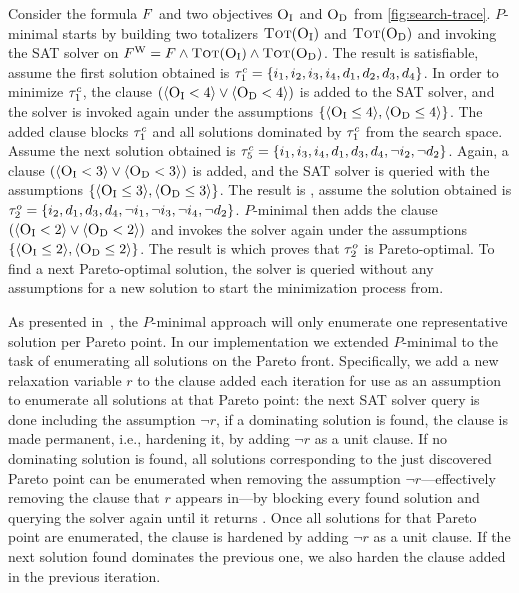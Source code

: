 \begin{example}\label{ex:pmin}
  Consider the formula $F$ and two objectives $\textsc{O}_{\text{I}}$ and $\textsc{O}_{\text{D}}$ from \cref{fig:search-trace}.
  $P$-minimal starts by building two totalizers $\textsc{Tot}(\textsc{O}_{\text{I}})$ and $\textsc{Tot}(\textsc{O}_{\text{D}})$ and invoking the SAT solver on $F^\text{W} = F \land \textsc{Tot}(\textsc{O}_{\text{I}}) \land \textsc{Tot}(\textsc{O}_{\text{D}})$.
  The result is satisfiable, assume the first solution obtained is $\tau^c_1 = \{i_1,\allowbreak i_2,\allowbreak i_3,\allowbreak i_4,\allowbreak d_1,\allowbreak d_2,\allowbreak d_3,\allowbreak d_4\}$. 
  In order to minimize $\tau^c_1$, the clause $(\langle \textsc{O}_{\text{I}} < 4 \rangle \lor \langle \textsc{O}_{\text{D}} < 4 \rangle)$ is added to the SAT solver, and the solver is invoked again under the assumptions $\{ \langle \textsc{O}_{\text{I}} \leq 4 \rangle, \langle \textsc{O}_{\text{D}} \leq 4 \rangle \}$.
  The added clause blocks $\tau^c_1$ and all solutions dominated by $\tau^c_1$ from the search space.
  Assume the next solution obtained is $\tau^c_5 = \{i_1,\allowbreak i_3,\allowbreak i_4,\allowbreak d_1,\allowbreak d_3,\allowbreak d_4,\allowbreak \lnot i_2,\allowbreak \lnot d_2\}$. 
  Again, a clause $(\langle \textsc{O}_{\text{I}} < 3 \rangle \lor \langle \textsc{O}_{\text{D}} < 3 \rangle)$ is added, and the SAT solver is queried with the assumptions $\{ \langle \textsc{O}_{\text{I}} \leq 3 \rangle, \langle \textsc{O}_{\text{D}} \leq 3 \rangle \}$.
  The result is \sat{}, assume the solution obtained is $\tau^o_2 = \{i_2,\allowbreak d_1,\allowbreak d_3,\allowbreak d_4,\allowbreak \lnot i_1,\allowbreak \lnot i_3,\allowbreak \lnot i_4,\allowbreak \lnot d_2\}$. 
  $P$-minimal then adds the clause $(\langle \textsc{O}_{\text{I}} < 2 \rangle \lor \langle \textsc{O}_{\text{D}} < 2 \rangle)$ and invokes the solver again under the assumptions $\{ \langle \textsc{O}_{\text{I}} \leq 2 \rangle, \langle \textsc{O}_{\text{D}} \leq 2 \rangle \}$.
  The result is \unsat{} which proves that $\tau^o_2$ is Pareto-optimal. 
  To find a next Pareto-optimal solution, the solver is queried without any assumptions for a new solution to start the minimization process from.
\end{example}

As presented in~\cite{DBLP:conf/cp/SohBTB17}, the $P$-minimal approach will only enumerate one representative solution per Pareto point.
In our implementation we extended $P$-minimal to the task of enumerating all solutions on the Pareto front.
Specifically, we add a new relaxation variable $r$ to the clause added each iteration for use as an assumption to enumerate all solutions at that Pareto point:
the next SAT solver query is done including the assumption $\lnot r$, if a dominating solution is found, the clause is made permanent, i.e., hardening it, by adding $\lnot r$ as a unit clause.
If no dominating solution is found, all solutions corresponding to the just discovered Pareto point can be enumerated when removing the assumption $\lnot r$---effectively removing the clause that $r$ appears in---by blocking every found solution and querying the solver again until it returns \unsat{}.
Once all solutions for that Pareto point are enumerated, the clause is hardened by adding $\lnot r$ as a unit clause.
If the next solution found dominates the previous one, we also harden the clause added in the previous iteration.

